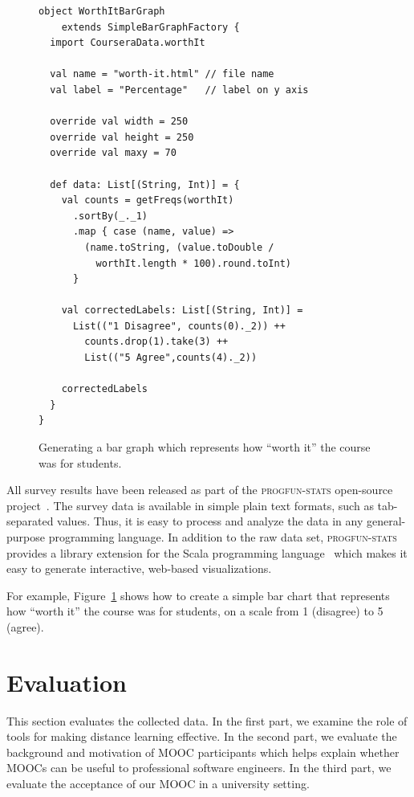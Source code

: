 \documentclass{sig-alternate}
\begin{document}
\begin{figure}[ht!]
  \begin{lstlisting}
object WorthItBarGraph
    extends SimpleBarGraphFactory {
  import CourseraData.worthIt

  val name = "worth-it.html" // file name
  val label = "Percentage"   // label on y axis

  override val width = 250
  override val height = 250
  override val maxy = 70

  def data: List[(String, Int)] = {
    val counts = getFreqs(worthIt)
      .sortBy(_._1)
      .map { case (name, value) =>
        (name.toString, (value.toDouble /
          worthIt.length * 100).round.toInt)
      }

    val correctedLabels: List[(String, Int)] =
      List(("1 Disagree", counts(0)._2)) ++
        counts.drop(1).take(3) ++
        List(("5 Agree",counts(4)._2))

    correctedLabels
  }
}
  \end{lstlisting}
  \caption{Generating a bar graph which
    represents how ``worth it'' the course was for students.}

  \label{fig:bar-chart}
\end{figure}

All survey results have been released as part of the \textsc{progfun-stats} open-source
project~\cite{progfun-stats}. The survey data is available in simple
plain text formats, such  as tab-separated values. Thus, it is easy to process
and analyze the data in any general-purpose programming language. In addition
to the raw data set, \textsc{progfun-stats} provides a library extension for
the Scala programming language~\cite{Odersky-Spoon-Venners07} which makes it
easy to generate interactive, web-based visualizations.

For example, Figure~\ref{fig:bar-chart} shows how to create a simple bar chart
that represents how ``worth it'' the course was for students, on a scale from
1 (disagree) to 5 (agree).


\section{Evaluation}
\label{sec:eval}

This section evaluates the collected data. In the first part, we examine the
role of tools for making distance learning effective. In the second part, we
evaluate the background and motivation of MOOC participants which helps
explain whether MOOCs can be useful to professional software engineers. In the
third part, we evaluate the acceptance of our MOOC in a university setting.
\end{document}
